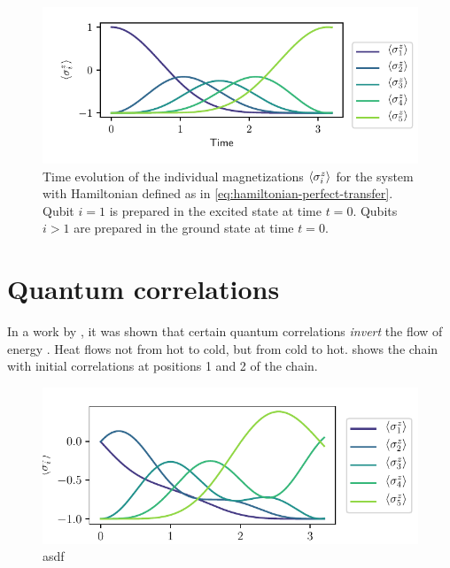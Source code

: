 \documentclass[a4paper,11pt]{scrartcl}
\begin{document}
\begin{figure}[H]
    \centering
    \includegraphics{expval_z.pdf}
    \caption{Time evolution of the individual magnetizations $\expval{\sigma^z_i}$ for the system with
    Hamiltonian defined as in \cref{eq:hamiltonian-perfect-transfer}.
    Qubit $i=1$ is prepared in the excited state at time $t=0$.
    Qubits $i>1$ are prepared in the ground state at time $t=0$.}
    \label{fig:no-corr}
\end{figure}
\section{Quantum correlations}
In a work by \citeauthor{BA_kaonan_correlations}, it was shown that certain quantum correlations
\emph{invert} the flow of energy \cite{BA_kaonan_correlations}. Heat flows not from hot to cold, but
from cold to hot.  shows the chain with initial correlations at positions 1 and 2 of the chain.
\begin{figure}
    \centering
    \includegraphics{12_expval_z.pdf}
    \caption{asdf}
    \label{fig:corr}
\end{figure}
\end{document}
